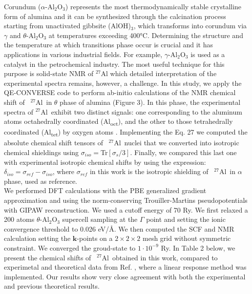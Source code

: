 \documentclass[final,3p,times,twocolumn]{elsarticle}
\begin{document}
\begin{small}
Corundum (\(\alpha\)-Al\(_2\)O\(_3\)) represents the most thermodynamically stable crystalline form of alumina and it can be synthesized through the calcination process starting from unactivated gibbsite (AlOH)\(_3\), which transforms into corundum via \(\gamma\) and \(\theta\)-Al\(_2\)O\(_3\) at temperatures exceeding 400°C. Determining the structure and the temperature at which transitions phase occur is crucial and it has applications in various industrial fields. For example, \(\gamma\)-Al\(_2\)O\(_3\) is used as a catalyst in the petrochemical industry. The most useful technique for this purpose is solid-state NMR of ${}^{27}$Al which detailed interpretation of the experimental spectra remains, however, a challenge. In this study, we apply the {\selectfont QE-CONVERSE} code to perform ab-initio calculations of the NMR chemical shift of \ ${}^{27}$Al\ in \(\theta\) phase of alumina (Figure 3). In this phase, the experimental spectra of ${}^{27}$Al\ exhibit two distinct signals: one corresponding to the aluminum atoms octahedrally coordinated (Al\textsubscript{oct}), and the other to those tetrahedrally coordinated (Al\textsubscript{tet}) by oxygen atoms \cite{ODELL2007169}. Implementing the Eq. 27 we computed the absolute chemical shift tensors of \ ${}^{27}$Al\ nuclei that we converted into isotropic chemical shieldings using $\sigma_{iso}=$Tr$\left [ \sigma_{s}/3 \right ]$. Finally, we compared this last one with experimental isotropic chemical shifts by using the expression: $\delta _{iso}=\sigma _{ref}-\sigma _{iso}$, where $\sigma _{ref}$ in this work is the isotropic shielding of \ ${}^{27}$Al\ in \(\alpha\) phase, used as reference. \\ We performed DFT calculations with the PBE generalized gradient approximation and using the norm-conserving Trouiller-Martins pseudopotentials with GIPAW reconstruction. We used a cutoff energy of 70 Ry. We first relaxed a 200 atoms \(\theta\)-Al\(_2\)O\(_3\) supercell sampling at the $\Gamma$ point and setting the ionic convergence threshold to 0.026 eV/\r{A}. We then computed the SCF and NMR calculation setting the $\mathbf{k}$-points on a $2\times 2\times 2$ mesh grid without symmetric constraint. We converged the groud-state to $1\cdot 10^{-9}$ Ry. In Table 2 below, we present the chemical shifts of \ ${}^{27}$Al\ obtained in this work, compared to experimetal \cite{ODELL2007169} and theoretical data from Ref. \cite{PhysRevB.84.235119}, where a linear response method was implemented. Our results show very close agreement with both the experimental and previous theoretical results.

\end{small}
\end{document}
